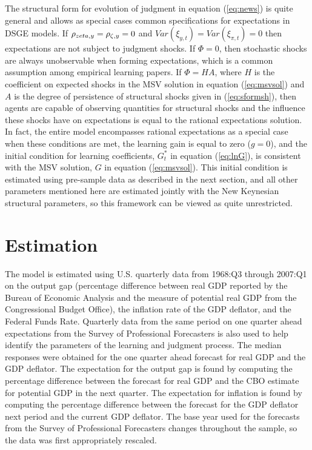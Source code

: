 \documentclass[12pt]{article}
\begin{document}
The structural form for evolution of judgment in equation (\ref{eq:news}) is quite general and allows as special cases common specifications for expectations in DSGE models.  If $\rho_{\\zeta,y} = \rho_{\zeta,y} = 0$ and $Var(\xi_{y,t}) = Var(\xi_{\pi,t}) = 0$ then expectations are not subject to judgment shocks.  If $\Phi=0$, then stochastic shocks are always unobservable when forming expectations, which is a common assumption among empirical learning papers.  If $\Phi=HA$, where $H$ is the coefficient on expected shocks in the MSV solution in equation (\ref{eq:msvsol}) and $A$ is the degree of persistence of structural shocks given in (\ref{eq:sformsh}), then agents are capable of observing quantities for structural shocks and the influence these shocks have on expectations is equal to the rational expectations solution.  In fact, the entire model encompasses rational expectations as a special case when these conditions are met, the learning gain is equal to zero ($g=0$), and the initial condition for learning coefficients, $G_t^*$ in equation (\ref{eq:lnG}), is consistent with the MSV solution, $G$ in equation (\ref{eq:msvsol}).  This initial condition is estimated using pre-sample data as described in the next section, and all other parameters mentioned here are estimated jointly with the New Keynesian structural parameters, so this framework can be viewed as quite unrestricted.

\section{Estimation}

The model is estimated using U.S. quarterly data from 1968:Q3 through 2007:Q1 on the output gap (percentage difference between real GDP reported by the Bureau of Economic Analysis and the measure of potential real GDP from the Congressional Budget Office), the inflation rate of the GDP deflator, and the Federal Funds Rate.  Quarterly data from the same period on one quarter ahead expectations from the Survey of Professional Forecasters is also used to help identify the parameters of the learning and judgment process.  The median responses were obtained for the one quarter ahead forecast for real GDP and the GDP deflator.  The expectation for the output gap is found by computing the percentage difference between the forecast for real GDP and the CBO estimate for potential GDP in the next quarter.  The expectation for inflation is found by computing the percentage difference between the forecast for the GDP deflator next period and the current GDP deflator.  The base year used for the forecasts from the Survey of Professional Forecasters changes throughout the sample, so the data was first appropriately rescaled.
\end{document}
